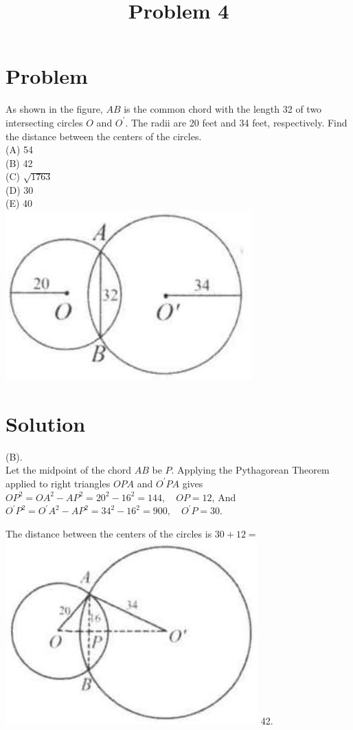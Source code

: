 \documentclass{article}
\title{Problem 4}
\date{}
\begin{document}
\maketitle

\section*{Problem}
As shown in the figure, \(A B\) is the common chord with the length 32 of two intersecting circles \(O\) and \(O^{\prime}\). The radii are 20 feet and 34 feet, respectively. Find the distance between the centers of the circles.\\
(A) 54\\
(B) 42\\
(C) \(\sqrt{1763}\)\\
(D) 30\\
(E) 40\\
\centering
\includegraphics[width=\textwidth]{images/problem_image_1.jpg}

\section*{Solution}
(B).\\
Let the midpoint of the chord \(A B\) be \(P\). Applying the Pythagorean Theorem applied to right triangles \(O P A\) and \(O^{\prime} P A\) gives\\
\(O P^{2}=O A^{2}-A P^{2}=20^{2}-16^{2}=144, \quad O P=12\), And \(O^{\prime} P^{2}=O^{\prime} A^{2}-A P^{2}=34^{2}-16^{2}=900, \quad O^{\prime} P=30\).

The distance between the centers of the circles is \(30+12=\)\\
\includegraphics[width=\textwidth]{images/reasoning_image_1.jpg} 42.
\end{document}
